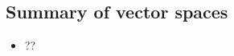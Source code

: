 
\begin{draft}
\section{Summary of vector spaces}
\label{sec:sumvs}

\begin{itemize}
\def\index#1{}%

\item ??
\end{itemize}


\end{draft}

\makeanswers
